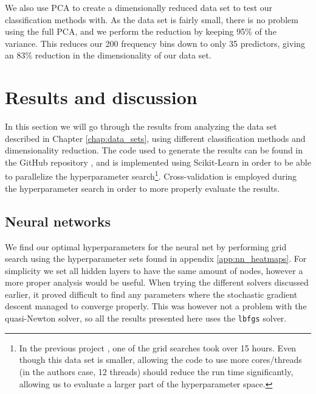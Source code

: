 \documentclass[a4paper]{article}
\newcommand\red[1]{\textcolor{red}{\textbf{#1}}}
\begin{document}
We also use PCA to create a dimensionally reduced data set to test our classification methods with.
As the data set is fairly small, there is no problem using the full PCA, and we perform the reduction by keeping 95\% of the variance. This reduces our 200 frequency bins down to only 35 predictors, giving an 83\% reduction in the dimensionality of our data set.

\section{Results and discussion} \label{chap:results}
In this section we will go through the results from analyzing the data set described in Chapter \ref{chap:data_sets}, using different classification methods and dimensionality reduction. The code used to generate the results can be found in the GitHub repository \cite{Github3}, and is implemented using Scikit-Learn \cite{scikit-learn} in order to be able to parallelize the hyperparameter search\footnote{In the previous project \cite{Github2}, one of the grid searches took over 15 hours. Even though this data set is smaller, allowing the code to use more cores/threads (in the authors case, 12 threads) should reduce the run time significantly, allowing us to evaluate a larger part of the hyperparameter space.}. Cross-validation is employed during the hyperparameter search in order to more properly evaluate the results.
\subsection{Neural networks}
We find our optimal hyperparameters for the neural net by performing grid search using the hyperparameter sets found in appendix \ref{app:nn_heatmaps}. For simplicity we set all hidden layers to have the same amount of nodes, however a more proper analysis would be useful. When trying the different solvers discussed earlier, it proved difficult to find any parameters where the stochastic gradient descent managed to converge properly. This was however not a problem with the quasi-Newton solver, so all the results presented here uses the \texttt{lbfgs} solver.
\end{document}

